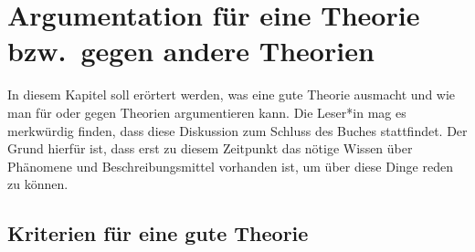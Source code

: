 
\chapter{Argumentation für eine Theorie bzw.\ gegen andere Theorien}
\label{Kapitel-argumentation}


In diesem Kapitel soll erörtert werden, was eine gute Theorie ausmacht
und wie man für oder gegen Theorien argumentieren kann. Die Leser*in mag
es merkwürdig finden, dass diese Diskussion zum Schluss des Buches stattfindet.
Der Grund hierfür ist, dass erst zu diesem Zeitpunkt das nötige Wissen
über Phänomene und Beschreibungsmittel vorhanden ist, um über diese Dinge reden
zu können.


\section{Kriterien für eine gute Theorie}
\label{sec-kriterien}


